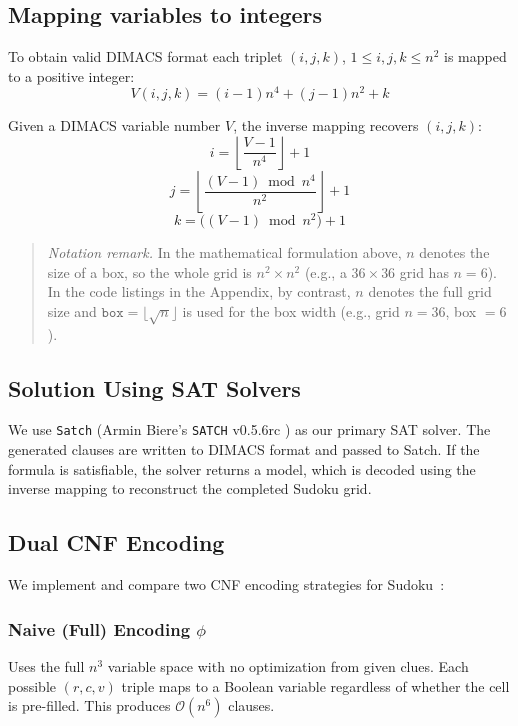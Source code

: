 \documentclass[12pt]{article}
\begin{document}
\subsection{Mapping variables to integers}
To obtain valid DIMACS format each triplet $(i,j,k)$, $1\leq i, j, k \leq n^2$ is mapped to a positive integer:
\[
V(i, j, k) = (i - 1)n^4 + (j - 1)n^2 + k
\]

Given a DIMACS variable number $V$, the inverse mapping recovers $(i,j,k)$:
\[
i = \left\lfloor \frac{V-1}{n^{4}} \right\rfloor + 1
\]
\[
j = \left\lfloor \frac{(V-1) \bmod n^{4}}{n^{2}} \right\rfloor + 1
\]
\[
k = \big((V-1) \bmod n^{2}\big) + 1
\]

\begin{quote}
\emph{Notation remark.} In the mathematical formulation above, $n$ denotes the size of a box, so the whole grid is $n^2 \times n^2$ (e.g., a $36\times36$ grid has $n=6$). In the code listings in the Appendix, by contrast, $n$ denotes the full grid size and $\texttt{box} = \lfloor\sqrt{n}\rfloor$ is used for the box width (e.g., grid $n=36$, box $=6$).
\end{quote}


\subsection{Solution Using SAT Solvers}

We use {\tt Satch} (Armin Biere's {\tt SATCH} v0.5.6rc \citep{Satch}) as our primary SAT solver. The generated clauses are written to DIMACS format and passed to Satch. If the formula is satisfiable, the solver returns a model, which is decoded using the inverse mapping to reconstruct the completed Sudoku grid.


\subsection{Dual CNF Encoding}
\label{sec:encoding}

We implement and compare two CNF encoding strategies for Sudoku~\citep{KwonJain2006}:

\subsubsection{Naive (Full) Encoding $\phi$}
Uses the full $n^3$ variable space with no optimization from given clues. Each possible $(r,c,v)$ triple maps to a Boolean variable regardless of whether the cell is pre-filled. This produces $\mathcal{O}(n^6)$ clauses.
\end{document}
